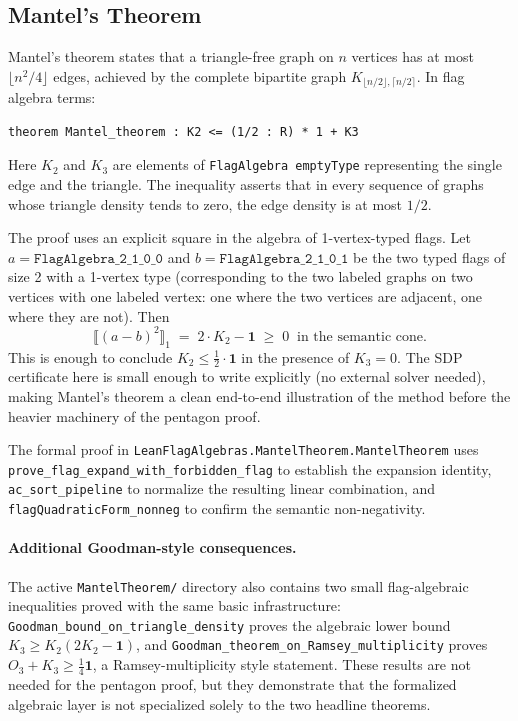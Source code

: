 \documentclass{article}
\newcommand{\lean}[1]{\texttt{#1}}
\begin{document}
\subsection{Mantel's Theorem}

Mantel's theorem states that a triangle-free graph on $n$ vertices has at
most $\lfloor n^2/4 \rfloor$ edges, achieved by the complete bipartite graph
$K_{\lfloor n/2\rfloor, \lceil n/2\rceil}$.  In flag algebra terms:

\begin{lstlisting}
theorem Mantel_theorem : K2 <= (1/2 : R) * 1 + K3
\end{lstlisting}

Here $K_2$ and $K_3$ are elements of \lean{FlagAlgebra emptyType} representing the
single edge and the triangle.  The inequality asserts that in every sequence
of graphs whose triangle density tends to zero, the edge density is at most
$1/2$.

The proof uses an explicit square in the algebra of 1-vertex-typed flags.
Let $a = \lean{FlagAlgebra\_2\_1\_0\_0}$ and $b = \lean{FlagAlgebra\_2\_1\_0\_1}$
be the two typed flags of size 2 with a 1-vertex type (corresponding to
the two labeled graphs on two vertices with one labeled vertex: one where the
two vertices are adjacent, one where they are not).
Then
\[
  \bigl\llbracket (a - b)^2 \bigr\rrbracket_1
  \;=\;
  2 \cdot K_2 - \mathbf{1}
  \;\geq\; 0
  \;\;\text{in the semantic cone.}
\]
This is enough to conclude $K_2 \leq \frac{1}{2} \cdot \mathbf{1}$ in the
presence of $K_3 = 0$.  The SDP certificate here is small enough to write
explicitly (no external solver needed), making Mantel's theorem a clean
end-to-end illustration of the method before the heavier machinery of the
pentagon proof.

The formal proof in \lean{LeanFlagAlgebras.MantelTheorem.MantelTheorem} uses
\lean{prove\_flag\_expand\_with\_forbidden\_flag} to establish the expansion
identity, \lean{ac\_sort\_pipeline} to normalize the resulting linear
combination, and \lean{flagQuadraticForm\_nonneg} to confirm the semantic
non-negativity.

\paragraph{Additional Goodman-style consequences.}
The active \lean{MantelTheorem/} directory also contains two small
flag-algebraic inequalities proved with the same basic infrastructure:
\lean{Goodman\_bound\_on\_triangle\_density} proves the algebraic lower bound
$K_3 \geq K_2(2K_2-\mathbf{1})$, and
\lean{Goodman\_theorem\_on\_Ramsey\_multiplicity} proves
$O_3 + K_3 \geq \frac14\mathbf{1}$, a Ramsey-multiplicity style statement.
These results are not needed for the pentagon proof, but they demonstrate that
the formalized algebraic layer is not specialized solely to the two headline
theorems.
\end{document}
